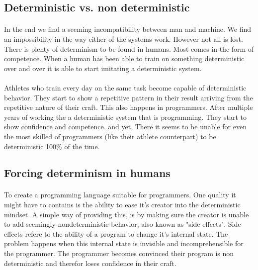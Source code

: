 \documentclass{scrartcl}
\begin{document}
    \subsection{Deterministic vs. non deterministic}
    \paragraph{}
    In the end we find a seeming incompatibility between man and machine.
    We find an impossibility in the way either of the systems work. However
    not all is lost. There is plenty of determinism to be found in humans.
    Most comes in the form of competence. When a human has been able to train
    on something deterministic over and over it is able to start imitating a
    deterministic system. 
    
    \paragraph{}
    Athletes who train every day on the same task become
    capable of deterministic behavior. They start to show a repetitive pattern
    in their result arriving from the repetitive nature of their craft. This also
    happens in programmers. After multiple years of working the a deterministic 
    system that is programming. They start to show confidence and competence. and
    yet, There it seems to be unable for even the most skilled of programmers (like
    their athlete counterpart) to be deterministic 100\% of the time.

    \subsection{Forcing determinism in humans}
    \paragraph{}
    To create a programming language suitable for programmers. One quality it might
    have to contains is the ability to ease it's creator into the deterministic mindset.
    A simple way of providing this, is by making sure the creator is unable to add
    seemingly nondeterministic behavior, also known as "side effects". Side effects
    refere to the ability of a program to change it's internal state. The problem happens
    when this internal state is invisible and incomprehensible for the programmer.
    The programmer becomes convinced their program is non deterministic and therefor 
    loses confidence in their craft. 
    
\end{document}
